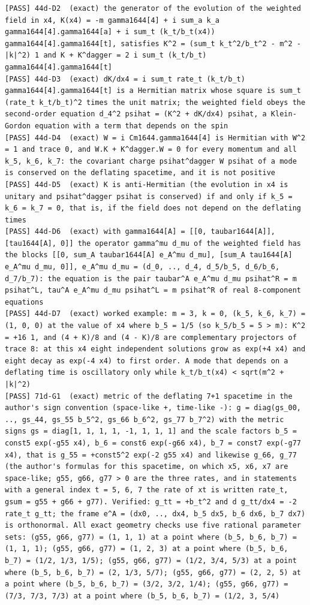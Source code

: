 \documentclass[
  10pt,
]{article}
\begin{document}
\begin{verbatim}
[PASS] 44d-D2  (exact) the generator of the evolution of the weighted field in x4, K(x4) = -m gamma1644[4] + i sum_a k_a gamma1644[4].gamma1644[a] + i sum_t (k_t/b_t(x4)) gamma1644[4].gamma1644[t], satisfies K^2 = (sum_t k_t^2/b_t^2 - m^2 - |k|^2) 1 and K + K^dagger = 2 i sum_t (k_t/b_t) gamma1644[4].gamma1644[t]
[PASS] 44d-D3  (exact) dK/dx4 = i sum_t rate_t (k_t/b_t) gamma1644[4].gamma1644[t] is a Hermitian matrix whose square is sum_t (rate_t k_t/b_t)^2 times the unit matrix; the weighted field obeys the second-order equation d_4^2 psihat = (K^2 + dK/dx4) psihat, a Klein-Gordon equation with a term that depends on the spin
[PASS] 44d-D4  (exact) W = i Cm1644.gamma1644[4] is Hermitian with W^2 = 1 and trace 0, and W.K + K^dagger.W = 0 for every momentum and all k_5, k_6, k_7: the covariant charge psihat^dagger W psihat of a mode is conserved on the deflating spacetime, and it is not positive
[PASS] 44d-D5  (exact) K is anti-Hermitian (the evolution in x4 is unitary and psihat^dagger psihat is conserved) if and only if k_5 = k_6 = k_7 = 0, that is, if the field does not depend on the deflating times
[PASS] 44d-D6  (exact) with gamma1644[A] = [[0, taubar1644[A]], [tau1644[A], 0]] the operator gamma^mu d_mu of the weighted field has the blocks [[0, sum_A taubar1644[A] e_A^mu d_mu], [sum_A tau1644[A] e_A^mu d_mu, 0]], e_A^mu d_mu = (d_0, .., d_4, d_5/b_5, d_6/b_6, d_7/b_7): the equation is the pair taubar^A e_A^mu d_mu psihat^R = m psihat^L, tau^A e_A^mu d_mu psihat^L = m psihat^R of real 8-component equations
[PASS] 44d-D7  (exact) worked example: m = 3, k = 0, (k_5, k_6, k_7) = (1, 0, 0) at the value of x4 where b_5 = 1/5 (so k_5/b_5 = 5 > m): K^2 = +16 1, and (4 + K)/8 and (4 - K)/8 are complementary projectors of trace 8: at this x4 eight independent solutions grow as exp(+4 x4) and eight decay as exp(-4 x4) to first order. A mode that depends on a deflating time is oscillatory only while k_t/b_t(x4) < sqrt(m^2 + |k|^2)
[PASS] 71d-G1  (exact) metric of the deflating 7+1 spacetime in the author's sign convention (space-like +, time-like -): g = diag(gs_00, .., gs_44, gs_55 b_5^2, gs_66 b_6^2, gs_77 b_7^2) with the metric signs gs = diag[1, 1, 1, 1, -1, 1, 1, 1] and the scale factors b_5 = const5 exp(-g55 x4), b_6 = const6 exp(-g66 x4), b_7 = const7 exp(-g77 x4), that is g_55 = +const5^2 exp(-2 g55 x4) and likewise g_66, g_77 (the author's formulas for this spacetime, on which x5, x6, x7 are space-like; g55, g66, g77 > 0 are the three rates, and in statements with a general index t = 5, 6, 7 the rate of xt is written rate_t, gsum = g55 + g66 + g77). Verified: g_tt = +b_t^2 and d g_tt/dx4 = -2 rate_t g_tt; the frame e^A = (dx0, .., dx4, b_5 dx5, b_6 dx6, b_7 dx7) is orthonormal. All exact geometry checks use five rational parameter sets: (g55, g66, g77) = (1, 1, 1) at a point where (b_5, b_6, b_7) = (1, 1, 1); (g55, g66, g77) = (1, 2, 3) at a point where (b_5, b_6, b_7) = (1/2, 1/3, 1/5); (g55, g66, g77) = (1/2, 3/4, 5/3) at a point where (b_5, b_6, b_7) = (2, 1/3, 5/7); (g55, g66, g77) = (2, 2, 5) at a point where (b_5, b_6, b_7) = (3/2, 3/2, 1/4); (g55, g66, g77) = (7/3, 7/3, 7/3) at a point where (b_5, b_6, b_7) = (1/2, 3, 5/4)

\end{verbatim}
\end{document}

